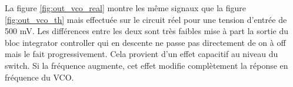La figure \ref{fig:out_vco_real} montre les même signaux que la figure \ref{fig:out_vco_th} mais effectuée sur le circuit réel pour une tension d'entrée de 500 mV. Les différences entre les deux sont très faibles mise à part la sortie du bloc integrator controller qui en descente ne passe pas directement de on à off mais le fait progressivement. Cela provient d'un effet capacitif au niveau du switch. Si la fréquence augmente, cet effet modifie complètement la réponse en fréquence du VCO.

